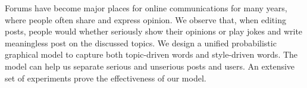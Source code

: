 Forums have become major places for online communications for many years, where people often share and express opinion. We observe that, when editing posts, people would whether seriously show their opinions or play jokes and write meaningless post on the discussed topics. We design a unified probabilistic graphical model to capture both topic-driven words and style-driven words. The model can help us separate serious and unserious posts and users. An extensive set of experiments prove the effectiveness of our model.
